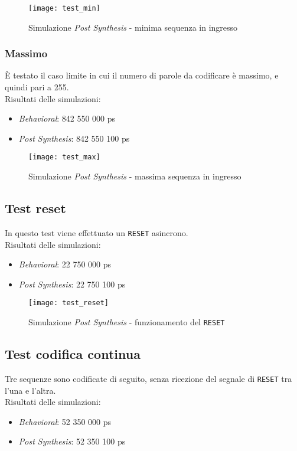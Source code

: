\documentclass{article}
\begin{document}
\begin{figure}[H]
    \centering
    \texttt{[image: test\_min]}
    \caption{Simulazione \emph{Post Synthesis} - minima sequenza in ingresso}
    \label{fig:min}
\end{figure}

\subsubsection{Massimo}
È testato il caso limite in cui il numero di parole da codificare è massimo, e quindi pari a 255.\\
Risultati delle simulazioni:
\begin{itemize}
    \item \emph{Behavioral}: 842 550 000  ps
    \item \emph{Post Synthesis}: 842 550 100 ps
\end{itemize}

\begin{figure}[h]
    \centering
    \texttt{[image: test\_max]}
    \caption{Simulazione \emph{Post Synthesis} - massima sequenza in ingresso}
    \label{fig:max}
\end{figure}

\newpage
\subsection{Test reset}
In questo test viene effettuato un \verb^RESET^ asincrono.\\
Risultati delle simulazioni:
\begin{itemize}
    \item \emph{Behavioral}: 22 750 000 ps
    \item \emph{Post Synthesis}: 22 750 100 ps
\end{itemize}
\begin{figure}[h]
    \centering
    \texttt{[image: test\_reset]}
    \caption{Simulazione \emph{Post Synthesis} - funzionamento del \verb^RESET^}
    \label{fig:reset}
\end{figure}


\subsection{Test codifica continua}
Tre sequenze sono codificate di seguito, senza ricezione del segnale di \verb^RESET^ tra l'una e l'altra.\\
Risultati delle simulazioni:
\begin{itemize}
    \item \emph{Behavioral}: 52 350 000 ps
    \item \emph{Post Synthesis}: 52 350 100 ps
\end{itemize}
\end{document}
